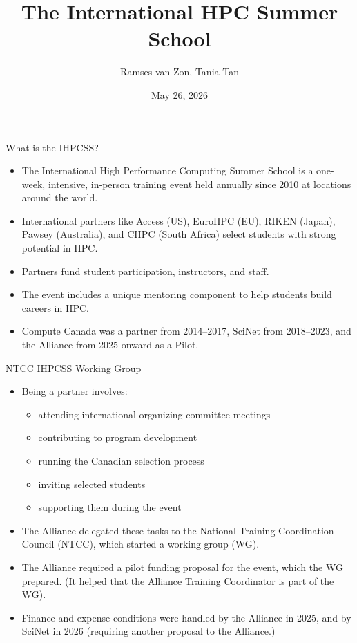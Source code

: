 \documentclass[
  11pt,
  ignorenonframetext,
  aspectratio=169]{beamer}
\title{The International HPC Summer School}
\author{Ramses van Zon, Tania Tan}
\date{May 26, 2026}
\providecommand{\tightlist}{%
  \setlength{\itemsep}{0pt}\setlength{\parskip}{0pt}}
\begin{document}
\frame[plain]{\titlepage}

\begin{frame}{What is the IHPCSS?}
\label{what-is-the-ihpcss}
\pause

\begin{itemize}
\item
  The International High Performance Computing Summer School is a one-week, intensive, in-person training event held annually since 2010 at locations around the world.

  \pause
\item
  International partners like Access (US), EuroHPC (EU), RIKEN (Japan), Pawsey (Australia), and CHPC (South Africa) select students with strong potential in HPC.

  \pause
\item
  Partners fund student participation, instructors, and staff.

  \pause
\item
  The event includes a unique mentoring component to help students build careers in HPC.

  \pause
\item
  Compute Canada was a partner from 2014--2017, SciNet from 2018--2023, and the Alliance from 2025 onward as a Pilot.
\end{itemize}
\end{frame}

\begin{frame}{NTCC IHPCSS Working Group}
\label{ntcc-ihpcss-working-group}
\pause

\vspace{-3mm}

\begin{itemize}
\item
  Being a partner involves:

  \begin{itemize}
  \tightlist
  \item
    attending international organizing committee meetings
  \item
    contributing to program development
  \item
    running the Canadian selection process
  \item
    inviting selected students
  \item
    supporting them during the event
  \end{itemize}

  \pause
\item
  The Alliance delegated these tasks to the National Training Coordination Council (NTCC), which started a working group (WG).

  \pause
\item
  The Alliance required a pilot funding proposal for the event, which the WG prepared. (It helped that the Alliance Training Coordinator is part of the WG).

  \pause
\item
  Finance and expense conditions were handled by the Alliance in 2025, and by SciNet in 2026 (requiring another proposal to the Alliance.)
\end{itemize}
\end{frame}
\end{document}

